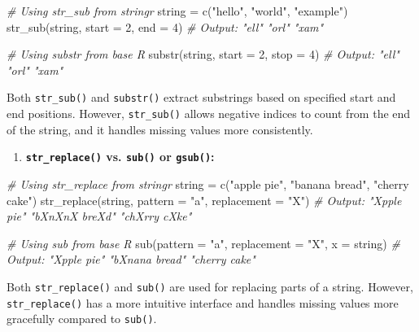 \documentclass[
]{article}
\newenvironment{Shaded}{}{}
\newcommand{\AttributeTok}[1]{\textcolor[rgb]{0.49,0.56,0.16}{#1}}
\newcommand{\CommentTok}[1]{\textcolor[rgb]{0.38,0.63,0.69}{\textit{#1}}}
\newcommand{\DecValTok}[1]{\textcolor[rgb]{0.25,0.63,0.44}{#1}}
\newcommand{\FunctionTok}[1]{\textcolor[rgb]{0.02,0.16,0.49}{#1}}
\newcommand{\NormalTok}[1]{#1}
\newcommand{\OtherTok}[1]{\textcolor[rgb]{0.00,0.44,0.13}{#1}}
\newcommand{\StringTok}[1]{\textcolor[rgb]{0.25,0.44,0.63}{#1}}
\begin{document}
\begin{Shaded}
\begin{Highlighting}[]
\CommentTok{\# Using str\_sub from stringr}
\NormalTok{string }\OtherTok{=} \FunctionTok{c}\NormalTok{(}\StringTok{"hello"}\NormalTok{, }\StringTok{"world"}\NormalTok{, }\StringTok{"example"}\NormalTok{)}
\FunctionTok{str\_sub}\NormalTok{(string, }\AttributeTok{start =} \DecValTok{2}\NormalTok{, }\AttributeTok{end =} \DecValTok{4}\NormalTok{)}
\CommentTok{\# Output: "ell" "orl" "xam"}

\CommentTok{\# Using substr from base R}
\FunctionTok{substr}\NormalTok{(string, }\AttributeTok{start =} \DecValTok{2}\NormalTok{, }\AttributeTok{stop =} \DecValTok{4}\NormalTok{)}
\CommentTok{\# Output: "ell" "orl" "xam"}
\end{Highlighting}
\end{Shaded}

Both \texttt{str\_sub()} and \texttt{substr()} extract substrings based
on specified start and end positions. However, \texttt{str\_sub()}
allows negative indices to count from the end of the string, and it
handles missing values more consistently.

\begin{enumerate}
\def\labelenumi{\arabic{enumi}.}
\item
  \textbf{\texttt{str\_replace()} vs. \texttt{sub()} or
  \texttt{gsub()}:}
\end{enumerate}

\begin{Shaded}
\begin{Highlighting}[]
\CommentTok{\# Using str\_replace from stringr}
\NormalTok{string }\OtherTok{=} \FunctionTok{c}\NormalTok{(}\StringTok{"apple pie"}\NormalTok{, }\StringTok{"banana bread"}\NormalTok{, }\StringTok{"cherry cake"}\NormalTok{)}
\FunctionTok{str\_replace}\NormalTok{(string, }\AttributeTok{pattern =} \StringTok{"a"}\NormalTok{, }\AttributeTok{replacement =} \StringTok{"X"}\NormalTok{)}
\CommentTok{\# Output: "Xpple pie" "bXnXnX breXd" "chXrry cXke"}

\CommentTok{\# Using sub from base R}
\FunctionTok{sub}\NormalTok{(}\AttributeTok{pattern =} \StringTok{"a"}\NormalTok{, }\AttributeTok{replacement =} \StringTok{"X"}\NormalTok{, }\AttributeTok{x =}\NormalTok{ string)}
\CommentTok{\# Output: "Xpple pie" "bXnana bread" "cherry cake"}
\end{Highlighting}
\end{Shaded}

Both \texttt{str\_replace()} and \texttt{sub()} are used for replacing
parts of a string. However, \texttt{str\_replace()} has a more intuitive
interface and handles missing values more gracefully compared to
\texttt{sub()}.
\end{document}
